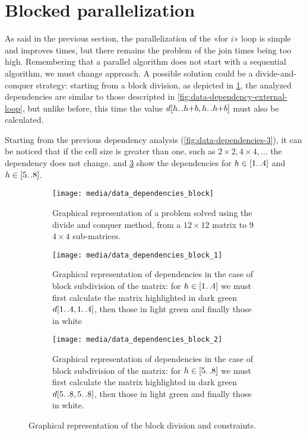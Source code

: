 \section{Blocked parallelization}\label{blocked_parallelization}

As said in the previous section, the parallelization of the «for \(i\)» loop is simple and improves times, but there remains the problem of the join times being too high. 
Remembering that a parallel algorithm does not start with a sequential algorithm, we must change approach.
A possible solution could be a divide-and-conquer strategy: starting from a block division, as depicted in \cref{fig:submatrix}, the analyzed dependencies are similar to those descripted in \cref{fig:data-dependency-external-loop}, but unlike before, this time the value \(d[h{\mathinner {\ldotp \ldotp}}h{+}b,h{\mathinner {\ldotp \ldotp}}h{+}b]\) must also be calculated.

Starting from the previous dependency analysis (\cref{fig:data-dependencies-3}), it can be noticed that if the cell size is greater than one, such as  \(  2 \times 2,  4 \times 4, \dots\) the dependency does not change.
 and \ref{fig:data-dependencies-block-2} show the dependencies for \(h \in [1{\mathinner {\ldotp \ldotp}}4]\) and \(h \in [5{\mathinner {\ldotp \ldotp}}8]\).

\begin{figure}[htbp]
    \centering
    \begin{subfigure}[t]{0.3\textwidth}
        \texttt{[image: media/data\_dependencies\_block]}
        \caption{Graphical representation of a problem solved using the divide and conquer method, from a \(12\times 12\) matrix to \(9\) \(4\times 4\) sub-matrices.}
        \label{fig:submatrix}
    \end{subfigure}
    \hfill
    \begin{subfigure}[t]{0.3\textwidth}
        \texttt{[image: media/data\_dependencies\_block\_1]}
        \caption{Graphical representation of dependencies in the case of block subdivision of the matrix: for \(h \in [1{\mathinner {\ldotp \ldotp}}4]\) we must first calculate the matrix highlighted in dark green \(d[1{\mathinner {\ldotp \ldotp}}4,1{\mathinner {\ldotp \ldotp}}4]\), then those in light green and finally those in white}
        \label{fig:data-dependencies-block-1}
    \end{subfigure}
    \hfill
    \begin{subfigure}[t]{0.3\textwidth}
        \texttt{[image: media/data\_dependencies\_block\_2]}
        \caption{Graphical representation of dependencies in the case of block subdivision of the matrix: for \(h \in [5{\mathinner {\ldotp \ldotp}}8]\) we must first calculate the matrix highlighted in dark green \(d[5{\mathinner {\ldotp \ldotp}}8,5{\mathinner {\ldotp \ldotp}}8]\), then those in light green and finally those in white.}
        \label{fig:data-dependencies-block-2}
    \end{subfigure}
    \caption{Graphical representation of the block division and constraints.}
    \label{fig:data-representation-of-the-block-division-and-constraints}
\end{figure}

